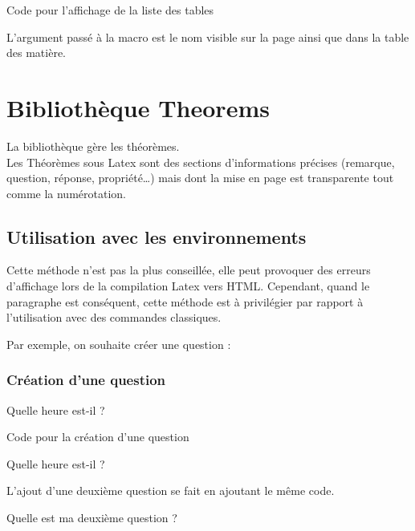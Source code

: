 {\begin{Latex}{Code pour l'affichage de la liste des tables}
\end{Latex}

L'argument passé à la macro est le nom visible sur la page ainsi que dans la table des matière.



\chapter {Bibliothèque Theorems}

La bibliothèque  gère les théorèmes.\\

Les Théorèmes sous Latex sont des sections d'informations précises (remarque, question, réponse, propriété\ldots) mais dont la mise en page est transparente tout comme la numérotation.\\


\section{Utilisation avec les environnements}

Cette méthode n'est pas la plus conseillée, elle peut provoquer des erreurs d'affichage lors de la compilation Latex vers HTML.
Cependant, quand le paragraphe est conséquent, cette méthode est à privilégier par rapport à l'utilisation avec des commandes classiques.


Par exemple, on souhaite créer une question : 

\subsection{Création d'une question}

\begin{question}
    Quelle heure est-il ?
\end{question}

\begin{Latex}{Code pour la création d'une question}
\begin{question}
    Quelle heure est-il ?
\end{question}
\end{Latex}

L'ajout d'une deuxième question se fait en ajoutant le même code.

\begin{question}
    Quelle est ma deuxième question ?
\end{question}


}
